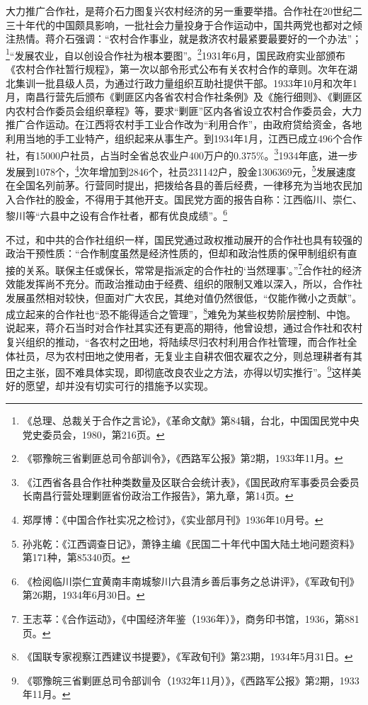 大力推广合作社，是蒋介石力图复兴农村经济的另一重要举措。合作社在20世纪二三十年代的中国颇具影响，一批社会力量投身于合作运动中，国共两党也都对之倾注热情。蒋介石强调：“农村合作事业，就是救济农村最紧要最要好的一个办法”；\footnote{《总理、总裁关于合作之言论》，《革命文献》第84辑，台北，中国国民党中央党史委员会，1980，第216页。}“发展农业，自以创设合作社为根本要图”。\footnote{《鄂豫皖三省剿匪总司令部训令》，《西路军公报》第2期，1933年11月。}1931年6月，国民政府实业部颁布《农村合作社暂行规程》，第一次以部令形式公布有关农村合作的章则。次年在湖北集训一批县级人员，为通过行政力量组织互助社提供干部。1933年10月和次年1月，南昌行营先后颁布《剿匪区内各省农村合作社条例》及《施行细则》、《剿匪区内农村合作委员会组织章程》等，要求“剿匪”区内各省设立农村合作委员会，大力推广合作运动。在江西将农村手工业合作改为“利用合作”，由政府贷给资金，各地利用当地的手工业特产，组织起来从事生产。到1934年1月，江西已成立496个合作社，有15000户社员，占当时全省总农业户400万户的0.375\%。\footnote{《江西省各县合作社种类数量及区联合会统计表》，《国民政府军事委员会委员长南昌行营处理剿匪省份政治工作报告》，第九章，第14页。}1934年底，进一步发展到1078个，\footnote{郑厚博：《中国合作社实况之检讨》，《实业部月刊》1936年10月号。}次年增加到2846个，社员231142户，股金1306369元，\footnote{孙兆乾：《江西调查日记》，萧铮主编《民国二十年代中国大陆土地问题资料》第171种，第85340页。}发展速度在全国名列前茅。行营同时提出，把拨给各县的善后经费，一律移充为当地农民加入合作社的股金，不得用于其他开支。国民党方面的报告自称：江西临川、崇仁、黎川等“六县中之设有合作社者，都有优良成绩”。\footnote{《检阅临川崇仁宜黄南丰南城黎川六县清乡善后事务之总讲评》，《军政旬刊》第26期，1934年6月30日。}


不过，和中共的合作社组织一样，国民党通过政权推动展开的合作社也具有较强的政治干预性质：“合作制度虽然是经济性质的，但却和政治性质的保甲制组织有直接的关系。联保主任或保长，常常是指派定的合作社的‘当然理事’。”\footnote{王志莘：《合作运动》，《中国经济年鉴（1936年）》，商务印书馆，1936，第881页。}合作社的经济效能发挥尚不充分。而政治推动由于经费、组织的限制又难以深入，所以，合作社发展虽然相对较快，但面对广大农民，其绝对值仍然很低，“仅能作微小之贡献”。成立起来的合作社也“恐不能得适合之管理”，\footnote{《国联专家视察江西建议书提要》，《军政旬刊》第23期，1934年5月31日。}难免为某些权势阶层控制、中饱。说起来，蒋介石当时对合作社其实还有更高的期待，他曾设想，通过合作社和农村复兴组织的推动，“各农村之田地，将陆续尽归农村利用合作社管理，而合作社全体社员，尽为农村田地之使用者，无复业主自耕农佃农雇农之分，则总理耕者有其田之主张，固不难具体实现，即彻底改良农业之方法，亦得以切实推行”。\footnote{《鄂豫皖三省剿匪总司令部训令（1932年11月）》，《西路军公报》第2期，1933年11月。}这样美好的愿望，却并没有切实可行的措施予以实现。


